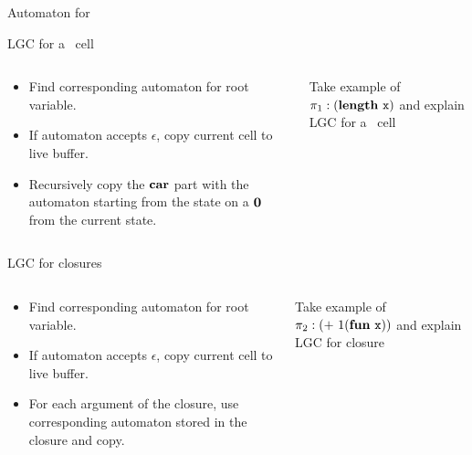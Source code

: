 \documentclass[xcolor=x11names,compress,mathserif]{beamer}
\renewcommand{\(}{\begin{columns}}
\renewcommand{\)}{\end{columns}}
\newcommand{\<}[1]{\begin{column}{#1}}
\renewcommand{\>}{\end{column}}
\begin{document}
\begin{frame}{Automaton for }

\end{frame}
\begin{frame}{LGC for a \CONS\ cell}
  \begin{columns}[c]
    \begin{column}{0.45\textwidth}
      \begin{itemize}
      \item Find corresponding automaton for root variable.
      \item If automaton accepts $\epsilon$, copy current cell to live buffer.
      \item Recursively copy the $\mbox{$\mathbf{car}$}$ part with the automaton starting from the state on a $\mathbf{0}$ from the current state.
      \end{itemize}
    \end{column}
    \begin{column}{0.50\textwidth}
      Take example of $\pi_1:(\plength\ \px)$ and explain
      LGC for a \CONS\  cell
    \end{column}
  \end{columns}
\end{frame}

\begin{frame}{LGC for closures}
   \begin{columns}[c]
    \begin{column}{0.45\textwidth}
      \begin{itemize}
      \item Find corresponding automaton for root variable.
      \item If automaton accepts $\epsilon$, copy current cell to live buffer.
      \item For each argument of the closure, use corresponding automaton stored in the closure and copy.
      \end{itemize}
    \end{column}
    \begin{column}{0.50\textwidth}
      Take example of $\pi_2:(+\ 1 (\pfun\ \px))$ and explain
      LGC for closure
    \end{column}
   \end{columns}
\end{frame}
\end{document}
